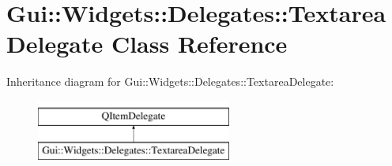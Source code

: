 \hypertarget{classGui_1_1Widgets_1_1Delegates_1_1TextareaDelegate}{\section{Gui\-:\-:Widgets\-:\-:Delegates\-:\-:Textarea\-Delegate Class Reference}
\label{classGui_1_1Widgets_1_1Delegates_1_1TextareaDelegate}
}
Inheritance diagram for Gui\-:\-:Widgets\-:\-:Delegates\-:\-:Textarea\-Delegate\-:\begin{figure}[H]
\begin{center}
\leavevmode
\includegraphics[height=2.000000cm]{df/d9e/classGui_1_1Widgets_1_1Delegates_1_1TextareaDelegate}
\end{center}
\end{figure}
